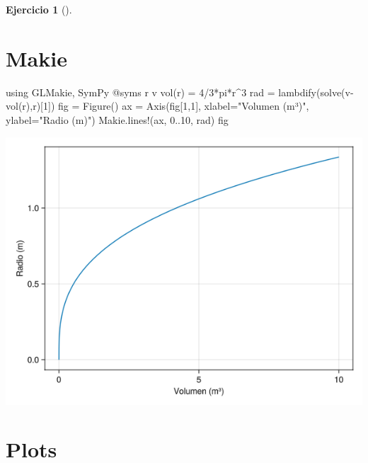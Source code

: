 \documentclass[
  a4paper,
]{scrreport}
\newenvironment{Shaded}{\begin{snugshade}}{\end{snugshade}}
\newcommand{\BuiltInTok}[1]{\textcolor[rgb]{0.00,0.23,0.31}{#1}}
\newcommand{\ConstantTok}[1]{\textcolor[rgb]{0.56,0.35,0.01}{#1}}
\newcommand{\FloatTok}[1]{\textcolor[rgb]{0.68,0.00,0.00}{#1}}
\newcommand{\FunctionTok}[1]{\textcolor[rgb]{0.28,0.35,0.67}{#1}}
\newcommand{\ImportTok}[1]{\textcolor[rgb]{0.00,0.46,0.62}{#1}}
\newcommand{\NormalTok}[1]{\textcolor[rgb]{0.00,0.23,0.31}{#1}}
\newcommand{\OperatorTok}[1]{\textcolor[rgb]{0.37,0.37,0.37}{#1}}
\newcommand{\PreprocessorTok}[1]{\textcolor[rgb]{0.68,0.00,0.00}{#1}}
\newcommand{\StringTok}[1]{\textcolor[rgb]{0.13,0.47,0.30}{#1}}
\theoremstyle{definition}
\newtheorem{exercise}{Ejercicio}[chapter]
\theoremstyle{remark}
\begin{document}
\begin{exercise}[]
\begin{enumerate}
\begin{tcolorbox}
  \section{Makie}

\begin{Shaded}
\begin{Highlighting}[]
\ImportTok{using} \BuiltInTok{GLMakie}\NormalTok{, }\BuiltInTok{SymPy}
\PreprocessorTok{@syms}\NormalTok{ r v}
\FunctionTok{vol}\NormalTok{(r) }\OperatorTok{=} \FloatTok{4}\OperatorTok{/}\FloatTok{3}\OperatorTok{*}\ConstantTok{pi}\OperatorTok{*}\NormalTok{r}\OperatorTok{\^{}}\FloatTok{3}
\NormalTok{rad }\OperatorTok{=} \FunctionTok{lambdify}\NormalTok{(}\FunctionTok{solve}\NormalTok{(}\FunctionTok{v{-}vol}\NormalTok{(r),r)[}\FloatTok{1}\NormalTok{])}
\NormalTok{fig }\OperatorTok{=} \FunctionTok{Figure}\NormalTok{()}
\NormalTok{ax }\OperatorTok{=} \FunctionTok{Axis}\NormalTok{(fig[}\FloatTok{1}\NormalTok{,}\FloatTok{1}\NormalTok{], xlabel}\OperatorTok{=}\StringTok{"Volumen (m³)"}\NormalTok{, ylabel}\OperatorTok{=}\StringTok{"Radio (m)"}\NormalTok{)}
\NormalTok{Makie.}\FunctionTok{lines!}\NormalTok{(ax, }\FloatTok{0}\OperatorTok{..}\FloatTok{10}\NormalTok{, rad)}
\NormalTok{fig}
\end{Highlighting}
\end{Shaded}

  \includegraphics{03-funciones-elementales_files/figure-pdf/cell-13-output-1.png}

  \section{Plots}


\end{tcolorbox}
\end{enumerate}
\end{exercise}
\end{document}
